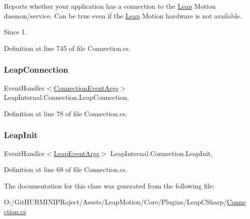 Reports whether your application has a connection to the \mbox{\hyperlink{namespace_leap}{Leap}} Motion daemon/service. Can be true even if the \mbox{\hyperlink{namespace_leap}{Leap}} Motion hardware is not available. 

\begin{DoxySince}{Since}
1. 
\end{DoxySince}


Definition at line 745 of file Connection.\+cs.

\mbox{\label{class_leap_internal_1_1_connection_a73e39e15e464b1c0b8a5394ecd085986}} 
\subsubsection{\texorpdfstring{LeapConnection}{LeapConnection}}
{\footnotesize\ttfamily Event\+Handler$<$\mbox{\hyperlink{class_leap_1_1_connection_event_args}{Connection\+Event\+Args}}$>$ Leap\+Internal.\+Connection.\+Leap\+Connection\hspace{0.3cm}{\ttfamily [add]}, {\ttfamily [remove]}}



Definition at line 78 of file Connection.\+cs.

\mbox{\label{class_leap_internal_1_1_connection_a4ecba08b7b5d52a5d3c9822454cd1633}} 
\subsubsection{\texorpdfstring{LeapInit}{LeapInit}}
{\footnotesize\ttfamily Event\+Handler$<$\mbox{\hyperlink{class_leap_1_1_leap_event_args}{Leap\+Event\+Args}}$>$ Leap\+Internal.\+Connection.\+Leap\+Init\hspace{0.3cm}{\ttfamily [add]}, {\ttfamily [remove]}}



Definition at line 68 of file Connection.\+cs.



The documentation for this class was generated from the following file\+:\begin{DoxyCompactItemize}
\item 
O\+:/\+Git\+H\+U\+B\+M\+I\+N\+I\+P\+Roject/\+Assets/\+Leap\+Motion/\+Core/\+Plugins/\+Leap\+C\+Sharp/\mbox{\hyperlink{_connection_8cs}{Connection.\+cs}}\end{DoxyCompactItemize}

